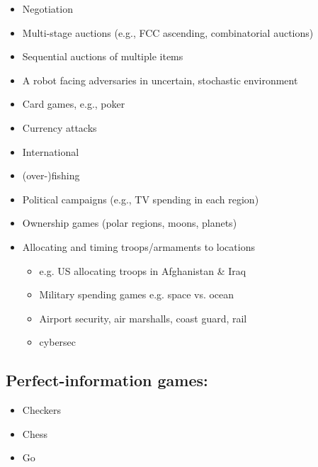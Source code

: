 \documentclass[
]{article}
\begin{document}
\begin{itemize}
\item
  Negotiation
\item
  Multi-stage auctions (e.g., FCC ascending, combinatorial auctions)
\item
  Sequential auctions of multiple items
\item
  A robot facing adversaries in uncertain, stochastic environment
\item
  Card games, e.g., poker
\item
  Currency attacks
\item
  International
\item
  (over-)fishing
\item
  Political campaigns (e.g., TV spending in each region)
\item
  Ownership games (polar regions, moons, planets)
\item
  Allocating and timing troops/armaments to locations

  \begin{itemize}
  \item
    e.g. US allocating troops in Afghanistan \& Iraq
  \item
    Military spending games e.g. space vs. ocean
  \item
    Airport security, air marshalls, coast guard, rail
  \item
    cybersec
  \end{itemize}
\end{itemize}

\subsection{Perfect-information games:}\label{perfect-information-games}

\begin{itemize}
\item
  Checkers
\item
  Chess
\item
  Go
\end{itemize}
\end{document}
